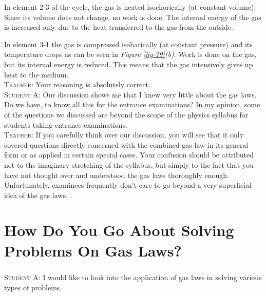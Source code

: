 \documentclass[a4paper,sfsidenotes]{tufte-book}
\begin{document}
In element 2-3 of the cycle, the gas is heated isochorically (at constant volume). Since its volume does not change, no work is done. The internal energy of the gas is increased only due to the heat transferred to the gas from the outside. 

In element 3-1 the gas is compressed isobarically (at constant pressure) and its temperature drops as can be seen in \emph{Figure \ref{fig-79}(b)}. Work is done on the gas, but its internal energy is reduced. This means that the gas intensively gives up heat to the medium.
\\
\textsc{Teacher:} Your reasoning is absolutely correct.
\\
\textsc{Student A:} Our discussion shows me that I knew very little about the gas laws. Do we have, to know all this for the entrance examinations? In my opinion, some of the questions we discussed are beyond the scope of the physics syllabus for students taking entrance examinations.
\\
\textsc{Teacher:} If you carefully think over our discussion, you will see that it only covered questions directly concerned with the combined gas law in its general form or as applied in certain special cases. Your confusion should be attributed not to the imaginary stretching of the syllabus, but simply to the fact that you have not thought over and understood the gas laws thoroughly enough. Unfortunately, examinees frequently don't care to go beyond a very superficial idea of the gas laws.

\chapter{How Do You Go About Solving Problems On Gas Laws?}
\label{ch-21}
\paragraph{}
\textsc{Student A:} I would like to look into the application of gas laws in solving various types of problems.
\end{document}
